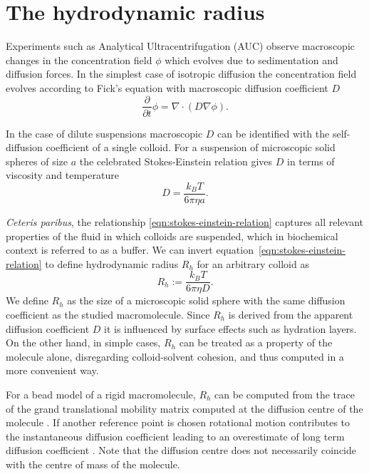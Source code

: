 \documentclass{doctoral}
\newcommand{\pd}{\partial}
\begin{document}
\section{The hydrodynamic radius}

Experiments such as Analytical Ultracentrifugation (AUC) observe macroscopic changes in the concentration field $\phi$ which evolves due to sedimentation and diffusion forces.
In the simplest case of isotropic diffusion the concentration field evolves according to Fick's equation with macroscopic diffusion coefficient $D$
\begin{equation}
    \frac{\pd}{\pd t} \phi = \nabla \cdot ( D \nabla \phi ).
    \label{eqn:ficks-law}
\end{equation}

In the case of dilute suspensions macroscopic $D$ can be identified with the self-diffusion coefficient of a single colloid.
For a suspension of microscopic solid spheres of size $a$ the celebrated Stokes-Einstein relation gives $D$ in terms of viscosity and temperature
\begin{equation}
    D = \frac{k_B T}{6 \pi \eta a}.
    \label{eqn:stokes-einstein-relation}
\end{equation}

\textit{Ceteris paribus}, the relationship \eqref{eqn:stokes-einstein-relation} captures all relevant properties of the fluid in which colloids are suspended, which in biochemical context is referred to as a buffer.
We can invert equation~\eqref{eqn:stokes-einstein-relation} to define hydrodynamic radius $R_h$ for an arbitrary colloid as
\begin{equation}
    R_h :=  \frac{k_B T}{6 \pi \eta D}.
    \label{eqn:hydrodynamic-radius-definition}
\end{equation}
We define $R_h$ as the size of a microscopic solid sphere with the same diffusion coefficient as the studied macromolecule.
Since $R_h$ is derived from the apparent diffusion coefficient $D$ it is influenced by surface effects such as hydration layers.
On the other hand, in simple cases, $R_h$ can be treated as a property of the molecule alone, disregarding colloid-solvent cohesion, and thus computed in a more convenient way.

For a bead model of a rigid macromolecule, $R_h$ can be computed from the trace of the grand translational mobility matrix computed at the diffusion centre of the molecule \cite{Zuk_2018}.
If another reference point is chosen rotational motion contributes to the instantaneous diffusion coefficient leading to an overestimate of long term diffusion coefficient \cite{Cichocki_2015}.
Note that the diffusion centre does not necessarily coincide with the centre of mass of the molecule.
\end{document}
